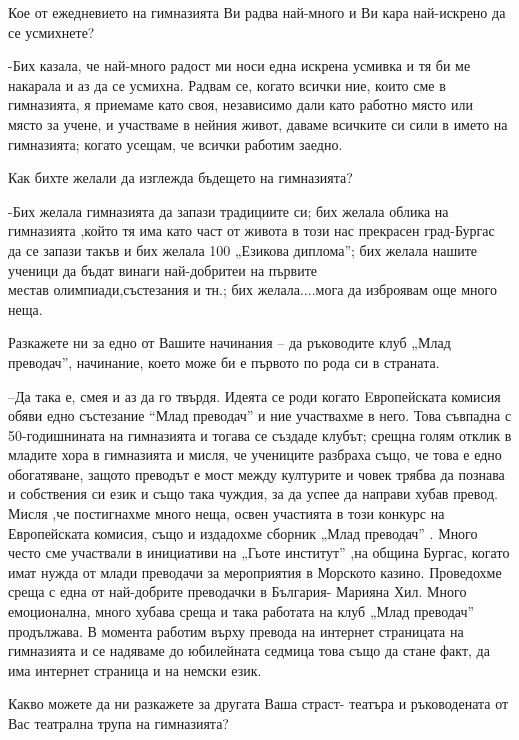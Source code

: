 \begin{multicols}{3}
Кое от ежедневието на гимназията Ви радва най-много и Ви кара най-искрено да се 
усмихнете?

-Бих казала, че най-много радост ми носи една искрена усмивка и тя би ме 
накарала и аз да се усмихна. Радвам се, когато всички ние, които сме в 
гимназията, я приемаме като своя, независимо дали като работно място или място 
за учене, и участваме в нейния живот, даваме всичките си сили в името на 
гимназията; когато усещам, че всички работим заедно.

Как бихте желали да изглежда бъдещето на гимназията? 

-Бих желала гимназията да запази традициите си; бих желала облика на гимназията 
,който  тя има като част от живота  в този нас прекрасен град-Бургас  да се 
запази такъв  и бих желала 100%
„Езикова диплома”; бих желала нашите ученици да бъдат винаги най-добритеи на първите\\[8cm] 

\noindent местав олимпиади,състезания и тн.; бих желала....мога да изброявам още 
много неща.

Разкажете ни за едно от Вашите начинания – да ръководите клуб „Млад преводач”, 
начинание, което може би е първото по рода си в страната.

–Да така е, смея и аз да го твърдя. Идеята се  роди когато Eвропейската комисия 
обяви едно състезание “Млад преводач”  и ние участвахме в него. Това съвпадна с 
50-годишнината на гимназията и тогава се създаде клубът; срещна голям отклик в 
младите хора в  гимназията и мисля, че учениците разбраха също, че това е едно 
обогатяване, защото преводът е мост между културите  и човек трябва да познава и 
собствения си език и също така чуждия, за да успее да направи хубав превод.  
Мисля ,че постигнахме много неща, освен участията  в този конкурс на  
Европейската комисия, също и издадохме сборник  „Млад преводач” . Много често 
сме участвали в инициативи на „Гьоте институт” ,на община Бургас, когато имат 
нужда от млади преводачи за мероприятия в Морското казино. Проведохме среща с 
една от най-добрите преводачки в България- Марияна Хил. Много емоционална, много 
хубава среща и така работата на клуб „Млад преводач” продължава. В момента 
работим върху превода на интернет страницата на  гимназията и се надяваме до 
юбилейната седмица това също да стане факт,  да има интернет страница и на 
немски език.

Какво можете да ни разкажете за другата Ваша страст- театъра и ръководената от 
Вас театрална трупа на гимназията?


\end{multicols}
